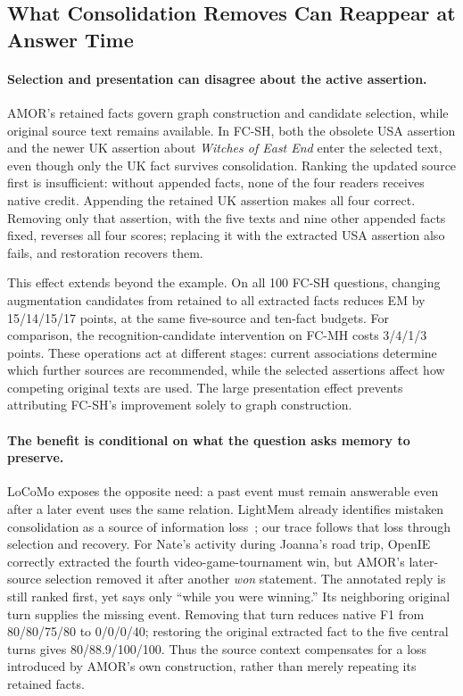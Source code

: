 \subsection{What Consolidation Removes Can Reappear at Answer Time}
\label{sec:memory-presentation}

\paragraph{Selection and presentation can disagree about the active assertion.}
AMOR's retained facts govern graph construction and candidate selection, while original source text remains available.
In FC-SH, both the obsolete USA assertion and the newer UK assertion about \emph{Witches of East End} enter the selected text, even though only the UK fact survives consolidation.
Ranking the updated source first is insufficient: without appended facts, none of the four readers receives native credit.
Appending the retained UK assertion makes all four correct.
Removing only that assertion, with the five texts and nine other appended facts fixed, reverses all four scores; replacing it with the extracted USA assertion also fails, and restoration recovers them.

This effect extends beyond the example.
On all 100 FC-SH questions, changing augmentation candidates from retained to all extracted facts reduces EM by 15/14/15/17 points, at the same five-source and ten-fact budgets.
For comparison, the recognition-candidate intervention on FC-MH costs 3/4/1/3 points.
These operations act at different stages: current associations determine which further sources are recommended, while the selected assertions affect how competing original texts are used.
The large presentation effect prevents attributing FC-SH's improvement solely to graph construction.

\paragraph{The benefit is conditional on what the question asks memory to preserve.}
LoCoMo exposes the opposite need: a past event must remain answerable even after a later event uses the same relation.
LightMem already identifies mistaken consolidation as a source of information loss~\citep{fang2026lightmem}; our trace follows that loss through selection and recovery.
For Nate's activity during Joanna's road trip, OpenIE correctly extracted the fourth video-game-tournament win, but AMOR's later-source selection removed it after another \emph{won} statement.
The annotated reply is still ranked first, yet says only ``while you were winning.''
Its neighboring original turn supplies the missing event.
Removing that turn reduces native F1 from 80/80/75/80 to 0/0/0/40; restoring the original extracted fact to the five central turns gives 80/88.9/100/100.
Thus the source context compensates for a loss introduced by AMOR's own construction, rather than merely repeating its retained facts.


